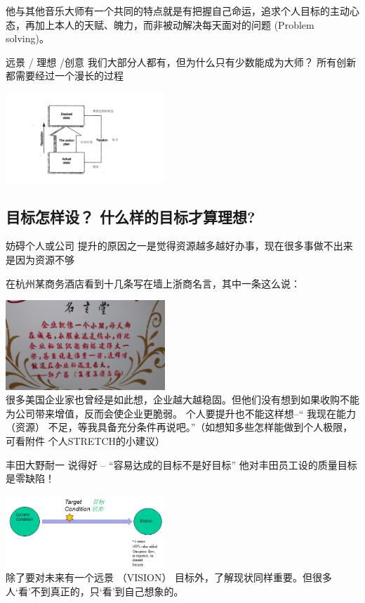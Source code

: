 他与其他音乐大师有一个共同的特点就是有把握自己命运，追求个人目标的主动心态，再加上本人的天赋、魄力，而非被动解决每天面对的问题
(Problem solving)。

远景 / 理想 /创意 我们大部分人都有，但为什么只有少数能成为大师？
所有创新都需要经过一个漫长的过程

\includegraphics[width=6cm]{liuct.jpg}\\

\hypertarget{ux76eeux6807ux600eux6837ux8bbe-ux4ec0ux4e48ux6837ux7684ux76eeux6807ux624dux7b97ux7406ux60f3}{%
\subsection{目标怎样设？
什么样的目标才算理想?}\label{ux76eeux6807ux600eux6837ux8bbe-ux4ec0ux4e48ux6837ux7684ux76eeux6807ux624dux7b97ux7406ux60f3}}

妨碍个人或公司
提升的原因之一是觉得资源越多越好办事，现在很多事做不出来是因为资源不够


在杭州某商务酒店看到十几条写在墙上浙商名言，其中一条这么说：

\includegraphics[width=6cm]{mingyant.jpg}\\
很多美国企业家也曾经是如此想，企业越大越稳固。但他们没有想到如果收购不能为公司带来增值，反而会使企业更脆弱。
个人要提升也不能这样想--`` 我现在能力 （资源）
不足，等我具备充分条件再说吧。''（如想知多些怎样能做到个人极限，可看附件
个人STRETCH的小建议）

丰田大野耐一 说得好 -- ``容易达成的目标不是好目标''
他对丰田员工设的质量目标是零缺陷！

\includegraphics[width=6cm]{mubiaozhungt.jpg}\\
除了要对未来有一个远景 （VISION）
目标外，了解现状同样重要。但很多人`看'不到真正的，只`看'到自己想象的。

